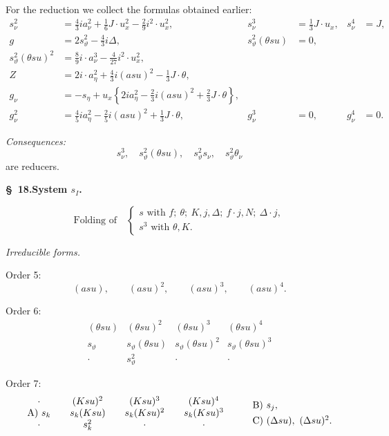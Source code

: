 \documentclass[11pt]{article}
\newcommand{\A}{\Delta}
\begin{document}
For the reduction we collect the formulas obtained earlier:
\[
\tag{24}
\begin{aligned}
s_\nu^2&=\frac43ia_\nu^2+\frac16J\cdot u_x^2-\frac29i^2\cdot u_x^2,
& s_\nu^3&=\frac13J\cdot u_x,
& s_\nu^4&=J,\\[0.3em]
g&=2s_\vartheta^2-\frac43i\A,
& s_\vartheta^2(\theta su)&=0,\\[0.3em]
s_\vartheta^2(\theta su)^2&=\frac89i\cdot a_\nu^3-\frac4{27}i^2\cdot u_x^2,\\[0.3em]
Z&=2i\cdot a_\eta^2+\frac43i(asu)^2-\frac13J\cdot\theta,\\[0.3em]
g_\nu&=-s_\eta+u_x\left\{2ia_\eta^2-\frac23i(asu)^2+\frac23J\cdot\theta\right\},\\[0.3em]
g_\nu^2&=\frac45ia_\eta^2-\frac25i(asu)^2+\frac13J\cdot\theta,
&g_\nu^3&=0,
&g_\nu^4&=0.
\end{aligned}
\]

\noindent\emph{Consequences:}
\[
 s_\nu^3,
\quad s_\vartheta^2(\theta su),
\quad s_\vartheta^2s_\nu,
\quad s_\vartheta^2\theta_\nu
\]
are reducers.

\begin{center}
\textbf{\S\ 18.\quad System $s_I$.}
\end{center}

\[
\text{Folding of}\quad
\left\{\begin{array}{l}
s\text{ with } f;\ \theta;\ K,j,\A;\ f\cdot j,N;\ \A\cdot j,\\
s^3\text{ with }\theta,K.
\end{array}\right.
\]

\noindent\emph{Irreducible forms.}

\noindent Order 5:
\[
(asu),\qquad (asu)^2,\qquad (asu)^3,\qquad (asu)^4.
\]

\noindent Order 6:
\[
\begin{array}{cccc}
(\theta su)&(\theta su)^2&(\theta su)^3&(\theta su)^4\\
s_\vartheta&s_\vartheta(\theta su)&s_\vartheta(\theta su)^2&s_\vartheta(\theta su)^3\\
\cdot&s_\vartheta^2&\cdot&\cdot
\end{array}
\]

\noindent Order 7:
\[
\begin{array}{c@{\qquad}c@{\qquad}c@{\qquad}c}
\cdot&(Ksu)^2&(Ksu)^3&(Ksu)^4\\
\text{A)}\ s_k&s_k(Ksu)&s_k(Ksu)^2&s_k(Ksu)^3\\
\cdot&s_k^2&\cdot&\cdot
\end{array}
\qquad
\begin{array}{l}
\text{B)}\ s_j,\\[0.4em]
\text{C)}\ (\A su),\ (\A su)^2.
\end{array}
\]
\end{document}
